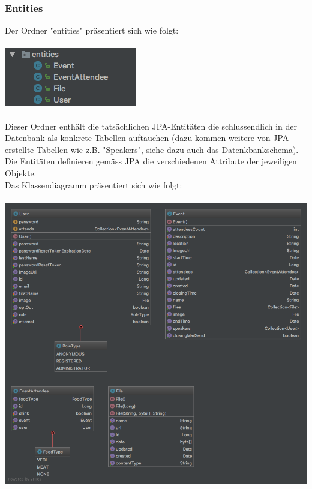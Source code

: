 \documentclass[11pt]{article} %
\begin{document}
\subsubsection{Entities}
Der Ordner "entities" präsentiert sich wie folgt:
\\
\\
\includegraphics[scale=0.7]{structure_eventmanagement_entities}
\\
\\
Dieser Ordner enthält die tatsächlichen JPA-Entitäten die schlussendlich in der Datenbank als konkrete Tabellen auftauchen (dazu kommen weitere von JPA erstellte Tabellen wie z.B. "Speakers", siehe dazu auch das  Datenkbankschema). Die Entitäten definieren gemäss JPA die verschiedenen Attribute der jeweiligen Objekte.
\\
Das Klassendiagramm präsentiert sich wie folgt:
\\
\\
\includegraphics[width=1.0\textwidth]{class-diagrams/Eventmanagement-Entities}
\\
\\
\end{document}
